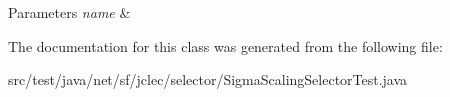 \begin{DoxyParams}{Parameters}
{\em name} & \\
\hline
\end{DoxyParams}


The documentation for this class was generated from the following file\-:\begin{DoxyCompactItemize}
\item 
src/test/java/net/sf/jclec/selector/Sigma\-Scaling\-Selector\-Test.\-java\end{DoxyCompactItemize}
